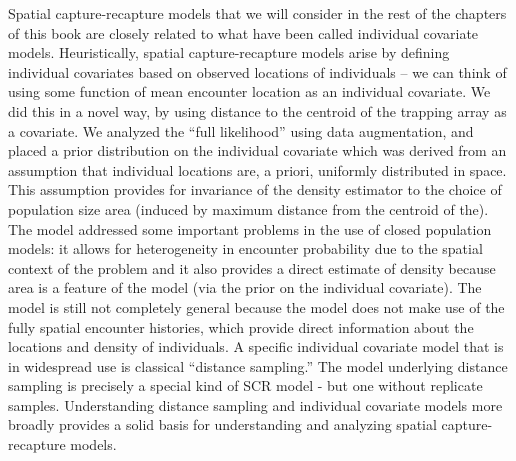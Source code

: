 Spatial capture-recapture models that we will consider in the rest of the chapters of this book are closely related to what have been called individual covariate models. Heuristically, spatial capture-recapture models arise by defining individual covariates based on observed locations of individuals -- we can think of using some function of mean encounter location as an individual covariate. We did this in a novel way, by using distance to the centroid of the trapping array as a covariate. We analyzed the ``full likelihood'' using data augmentation, and placed a prior distribution on the individual covariate which was derived from an assumption that individual locations are, a priori, uniformly distributed in space. This assumption provides for invariance of the density estimator to the choice of population size area (induced by maximum distance from the centroid of the). The model addressed some important problems in the use of closed population models: it allows for heterogeneity in encounter probability due to the spatial context of the problem and it also provides a direct estimate of density because area is a feature of the model (via the prior on the individual covariate). The model is still not completely general because the model does not make use of the fully spatial encounter histories, which provide direct information about the locations and density of individuals.
A specific individual covariate model that is in widespread use is
classical ``distance sampling.'' The model underlying distance sampling is precisely a special kind of SCR model - but one without replicate samples. Understanding distance sampling and individual covariate models more broadly provides a solid basis for understanding and analyzing spatial capture-recapture models.

